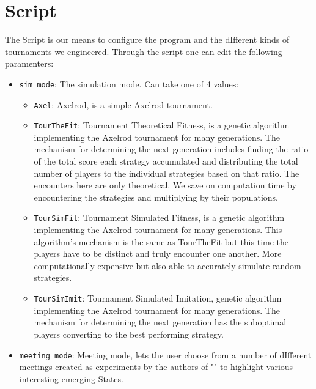 \documentclass[12pt]{report}
\begin{document}
\clearpage
\section{Script}
The Script is our means to configure the program and the dIfferent kinds of tournaments we engineered. Through the script one can edit the following paramenters:
\begin{itemize}
    \item \texttt{sim\_mode}: The simulation mode. Can take one of 4 values:
        \begin{itemize}
            \item \texttt{Axel}: Axelrod, is a simple Axelrod tournament.
            \item \texttt{TourTheFit}: Tournament Theoretical Fitness, is a genetic algorithm implementing the Axelrod tournament for many generations. The mechanism for determining the next generation includes finding the ratio of the total score each strategy accumulated and distributing the total number of players to the individual strategies based on that ratio. The encounters here are only theoretical. We save on computation time by encountering the strategies and multiplying by their populations. 
            \item \texttt{TourSimFit}: Tournament Simulated Fitness, is a genetic algorithm implementing the Axelrod tournament for many generations. This algorithm's mechanism is the same as TourTheFit but this time the players have to be distinct and truly encounter one another. More computationally expensive but also able to accurately simulate random strategies.
            \item \texttt{TourSimImit}: Tournament Simulated Imitation, genetic algorithm implementing the Axelrod tournament for many generations. The mechanism for determining the next generation has the suboptimal players converting to the best performing strategy.
        \end{itemize}
    \item \texttt{meeting\_mode}: Meeting mode, lets the user choose from a number of dIfferent meetings created as experiments by the authors of "" to highlight various interesting emerging States.
\end{itemize}
\end{document}
